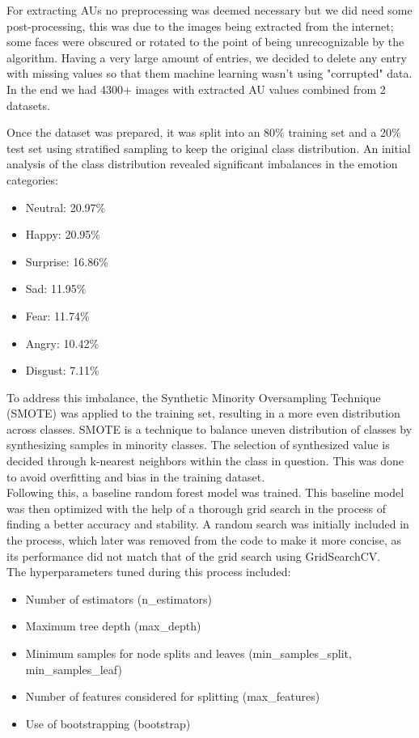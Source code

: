 \documentclass[conference]{IEEEtran}
\begin{document}
For extracting AUs no preprocessing was deemed necessary but we did need some post-processing, this was
due to the images being extracted from the internet; some faces were obscured or rotated to the point
of being unrecognizable by the algorithm. Having a very large amount of entries, we decided to delete any entry with missing values so that them
machine learning wasn't using "corrupted" data. In the end we had 4300+ images with extracted AU values combined from 2 datasets.


Once the dataset was prepared, it was split into an 80\% training set and a 20\% test set using stratified sampling to keep the original class distribution. An initial analysis of the class distribution revealed significant imbalances in the emotion categories:
\begin{itemize}
    \item Neutral: 20.97\%
	\item Happy: 20.95\%
	\item Surprise: 16.86\%
	\item Sad: 11.95\%
	\item Fear: 11.74\%
	\item Angry: 10.42\%
	\item Disgust: 7.11\%
\end{itemize}	
To address this imbalance, the Synthetic Minority Oversampling Technique (SMOTE) was applied to the training set, resulting in a more even distribution across classes. SMOTE is a technique to balance uneven distribution of classes by synthesizing samples in minority classes. The selection of synthesized value is decided through k-nearest neighbors within the class in question. This was done to avoid overfitting and bias in the training dataset.  
\\Following this, a baseline random forest model was trained.
This baseline model was then optimized with the help of a thorough grid search in the process of finding a better accuracy and stability. A random search was initially included in the process, which later was removed from the code to make it more concise, as its performance did not match that of the grid search using GridSearchCV.
\\
The hyperparameters tuned during this process included:
\begin{itemize}
    \item Number of estimators (n\_estimators)
	\item Maximum tree depth (max\_depth)
	\item Minimum samples for node splits and leaves (min\_samples\_split, min\_samples\_leaf)
	\item Number of features considered for splitting (max\_features)
	\item Use of bootstrapping (bootstrap)
\end{itemize}	
    
\end{document}
